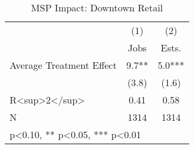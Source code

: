 \begin{table}[htbp]\centering
\def\sym#1{\ifmmode^{#1}\else\(^{#1}\)\fi}
\caption{MSP Impact: Downtown Retail}
\begin{tabular}{l*{2}{c}}
\hline\hline
            &\multicolumn{1}{c}{(1)}   &\multicolumn{1}{c}{(2)}   \\
            &        Jobs   &       Ests.   \\
\hline
Average Treatment Effect&         9.7** &         5.0***\\
            &       (3.8)   &       (1.6)   \\
\hline
R<sup>2</sup>&        0.41   &        0.58   \\
N           &        1314   &        1314   \\
\hline\hline
\multicolumn{3}{l}{\footnotesize * p<0.10, ** p<0.05, *** p<0.01}\\
\end{tabular}
\end{table}
